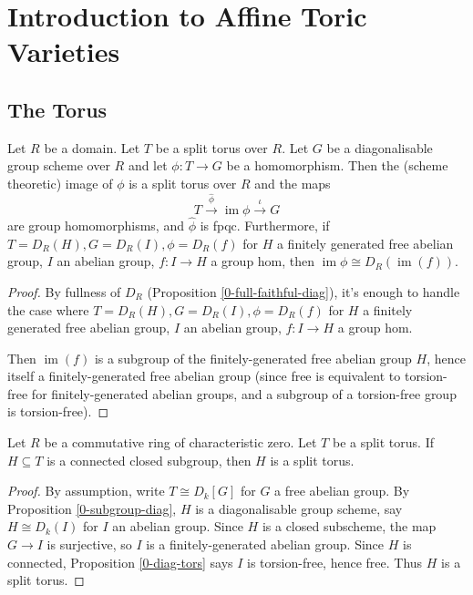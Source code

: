 \section{Introduction to Affine Toric Varieties}


\subsection{The Torus}


\begin{proposition}
  \label{1-1-1-group-hom-torus} %

  Let $R$ be a domain. Let $T$ be a split torus over $R$.
  Let $G$ be a diagonalisable group scheme over $R$ and let $\phi: T \to G$ be a homomorphism.
  Then the (scheme theoretic) image of $\phi$ is a split torus over $R$ and the maps
  \[
    T \xrightarrow{\hat{\phi}} \operatorname{im}\phi \xrightarrow{\iota} G
  \]
  are group homomorphisms, and $\hat{\phi}$ is fpqc.
  Furthermore, if $T = D_R(H), G = D_R(I), \phi = D_R(f)$
  for $H$ a finitely generated free abelian group, $I$ an abelian group, $f : I \to H$ a group hom,
  then $\operatorname{im} \phi \cong D_R(\operatorname{im}(f))$.
\end{proposition}
\begin{proof}

  By fullness of $D_R$ (Proposition \ref{0-full-faithful-diag}),
  it's enough to handle the case where $T = D_R(H), G = D_R(I), \phi = D_R(f)$
  for $H$ a finitely generated free abelian group, $I$ an abelian group, $f : I \to H$ a group hom.

  Then $\operatorname{im}(f)$ is a subgroup of the finitely-generated free abelian group $H$,
  hence itself a finitely-generated free abelian group
  (since free is equivalent to torsion-free for finitely-generated abelian groups,
  and a subgroup of a torsion-free group is torsion-free).
\end{proof}


\begin{proposition}
  \label{1-1-1-subgroup-torus}

  Let $R$ be a commutative ring of characteristic zero.
  Let $T$ be a split torus.
  If $H \subseteq T$ is a connected closed subgroup, then $H$ is a split torus.
\end{proposition}
\begin{proof}

  By assumption, write $T \cong D_k[G]$ for $G$ a free abelian group.
  By Proposition \ref{0-subgroup-diag}, $H$ is a diagonalisable group scheme,
  say $H \cong D_k(I)$ for $I$ an abelian group.
  Since $H$ is a closed subscheme, the map $G \to I$ is surjective,
  so $I$ is a finitely-generated abelian group.
  Since $H$ is connected, Proposition \ref{0-diag-tors} says $I$ is torsion-free, hence free.
  Thus $H$ is a split torus.
\end{proof}


